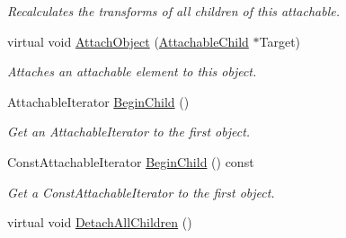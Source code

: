 \begin{DoxyCompactItemize}
\begin{DoxyCompactList}\small\item\em Recalculates the transforms of all children of this attachable. \item\end{DoxyCompactList}\item 
virtual void \hyperlink{classMezzanine_1_1AttachableParent_a558c6e2dd0a31cd99bb7872394de9c00}{AttachObject} (\hyperlink{classMezzanine_1_1AttachableChild}{AttachableChild} $\ast$Target)
\begin{DoxyCompactList}\small\item\em Attaches an attachable element to this object. \item\end{DoxyCompactList}\item 
AttachableIterator \hyperlink{classMezzanine_1_1AttachableParent_a6ed49c42b138227094b579638fd06538}{BeginChild} ()
\begin{DoxyCompactList}\small\item\em Get an AttachableIterator to the first object. \item\end{DoxyCompactList}\item 
ConstAttachableIterator \hyperlink{classMezzanine_1_1AttachableParent_a4693daab5f6ad884fbe64f718c016384}{BeginChild} () const 
\begin{DoxyCompactList}\small\item\em Get a ConstAttachableIterator to the first object. \item\end{DoxyCompactList}\item 
\hypertarget{classMezzanine_1_1AttachableParent_ae4c567231013730e4259fb164e8e1f0d}{
virtual void \hyperlink{classMezzanine_1_1AttachableParent_ae4c567231013730e4259fb164e8e1f0d}{DetachAllChildren} ()}
\label{classMezzanine_1_1AttachableParent_ae4c567231013730e4259fb164e8e1f0d}


\end{DoxyCompactItemize}
